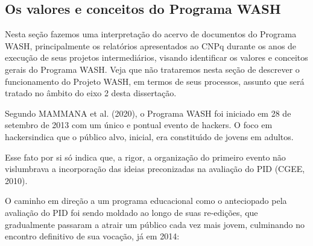 \documentclass[
12pt,		%
openright,	%
twoside,  %
a4paper,			%
chapter=TITLE,		%
english,			%
french,				%
spanish,			%
brazil				%
]{USPSC-classe/USPSC}
\begin{document}
\subsection[Os valores e conceitos do Programa WASH]{Os valores e conceitos do Programa WASH}\label{Os valores e conceitos do Programa WASH}
Nesta se\c{c}\~ao fazemos uma interpreta\c{c}\~ao do acervo de documentos do Programa WASH, principalmente os relat\'orios apresentados ao CNPq durante os anos de execu\c{c}\~ao de seus projetos intermedi\'arios, visando identificar os valores e conceitos gerais do Programa WASH. Veja que n\~ao trataremos nesta se\c{c}\~ao de descrever o funcionamento do Projeto WASH, em termos de seus processos, assunto que ser\'a tratado no \^ambito do eixo 2 desta disserta\c{c}\~ao.









Segundo MAMMANA et al. (2020), o Programa WASH foi iniciado em 28 de setembro de 2013 com um \textquotedbl \'unico e pontual evento de hackers\textquotedbl . O foco em \textquotedbl hackers\textquotedbl  indica que o p\'ublico alvo, inicial, era constitu\'{\i}do de jovens em adultos.









Esse fato por si s\'o indica que, a rigor, a organiza\c{c}\~ao do primeiro evento n\~ao vislumbrava a incorpora\c{c}\~ao das ideias preconizadas na avalia\c{c}\~ao do PID  (CGEE, 2010).









O caminho em dire\c{c}\~ao a um programa educacional como o anteciopado pela avalia\c{c}\~ao do PID foi sendo moldado ao longo de suas re-edi\c{c}\~oes, que gradualmente passaram a atrair um p\'ublico cada vez mais jovem, culminando no encontro definitivo de sua voca\c{c}\~ao, j\'a em 2014:










\noindent\begin{center}\mbox{\centering{}}\end{center}
\end{document}
